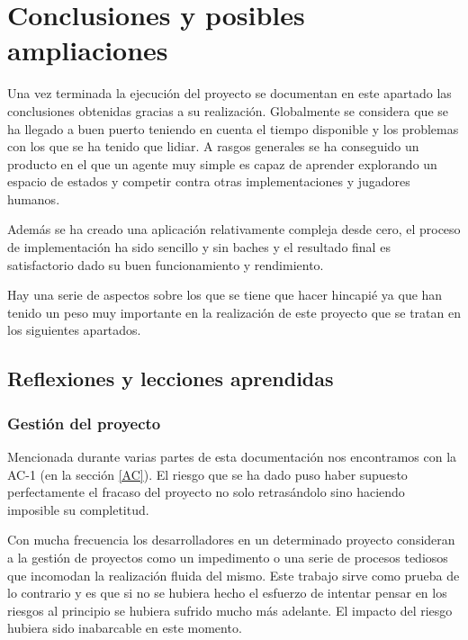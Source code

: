\chapter{Conclusiones y posibles ampliaciones}

\label{cap:conclusiones}

Una vez terminada la ejecución del proyecto se documentan en este apartado las conclusiones obtenidas gracias a su realización. Globalmente se considera que se ha llegado a buen puerto teniendo en cuenta el tiempo disponible y los problemas con los que se ha tenido que lidiar. A rasgos generales se ha conseguido un producto en el que un agente muy simple es capaz de aprender explorando un espacio de estados y competir contra otras implementaciones y jugadores humanos.

\bigskip

Además se ha creado una aplicación relativamente compleja desde cero, el proceso de implementación ha sido sencillo y sin baches y el resultado final es satisfactorio dado su buen funcionamiento y rendimiento.

\bigskip

Hay una serie de aspectos sobre los que se tiene que hacer hincapié ya que han tenido un peso muy importante en la realización de este proyecto que se tratan en los siguientes apartados.

\section{Reflexiones y lecciones aprendidas}

\subsection{Gestión del proyecto}

Mencionada durante varias partes de esta documentación nos encontramos con la AC-1 (en la sección \ref{AC}). El riesgo que se ha dado puso haber supuesto perfectamente el fracaso del proyecto no solo retrasándolo sino haciendo imposible su completitud.

\bigskip

Con mucha frecuencia los desarrolladores en un determinado proyecto consideran a la gestión de proyectos como un impedimento o una serie de procesos tediosos que incomodan la realización fluida del mismo. Este trabajo sirve como prueba de lo contrario y es que si no se hubiera hecho el esfuerzo de intentar pensar en los riesgos al principio se hubiera sufrido mucho más adelante. El impacto del riesgo hubiera sido inabarcable en este momento.

